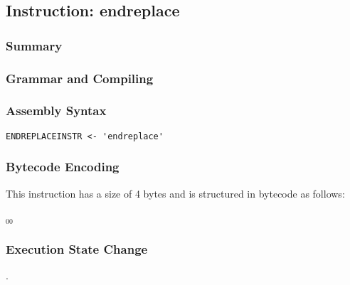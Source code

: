 \subsection{Instruction: endreplace}

\subsubsection{Summary}


\subsubsection{Grammar and Compiling}


\subsubsection{Assembly Syntax}

\begin{myquote}
\begin{verbatim}
ENDREPLACEINSTR <- 'endreplace'
\end{verbatim}
\end{myquote}


\subsubsection{Bytecode Encoding}

This instruction has a size of 4 bytes and is structured in bytecode as follows:

$_{00}$\ 


\subsubsection{Execution State Change}

.


